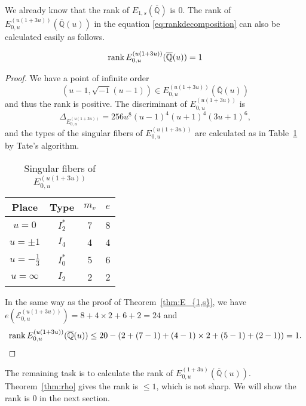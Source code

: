 \documentclass[main]{subfiles}
\begin{document}
We already know that the rank of $E_{1,s}(\overline{\mathbb{Q}})$ is $0$.
The rank of $E_{0,u}^{(u(1 + 3u))}(\overline{\mathbb{Q}}(u))$ in the equation \eqref{eq:rankdecomposition} can also be calculated easily as follows.

\begin{thm}
    \begin{equation*}
        \operatorname{rank} E_{0,u}^{(u(1 + 3u))}(\overline{\mathbb{Q}}(u)) = 1
    \end{equation*}
\end{thm}
\begin{proof}
    We have a point of infinite order
    \begin{equation*}
        (u - 1, \sqrt{-1}(u - 1)) \in E_{0,u}^{(u(1 + 3u))}(\overline{\mathbb{Q}}(u))
    \end{equation*}
    and thus the rank is positive.
    The discriminant of $E_{0,u}^{(u(1 + 3u))}$ is
    \begin{equation*}
        \Delta_{E_{0,u}^{(u(1 + 3u))}} = 256u^{8}(u - 1)^{4}(u + 1)^{4}(3u + 1)^{6},
    \end{equation*}
    and the types of the singular fibers of $E_{0,u}^{(u(1 + 3u))}$ are calculated as in Table~\ref{tab:E_{0,u}^{(u(1 + 3u))}} by Tate's algorithm.
    \begin{table}[H]
        \centering
        \caption{Singular fibers of $E_{0,u}^{(u(1 + 3u))}$}
        \begin{tabular}{|c|c|c|c|}
            \hline
            Place            & Type    & $m_v$ & $e$ \\
            \hline
            $u=0$            & $I_2^*$ & 7     & 8   \\
            $u=\pm 1$        & $I_4$   & 4     & 4   \\
            $u=-\frac{1}{3}$ & $I_0^*$ & 5     & 6   \\
            $u=\infty$       & $I_2$   & 2     & 2   \\
            \hline
        \end{tabular}
        \label{tab:E_{0,u}^{(u(1 + 3u))}}
    \end{table}
    In the same way as the proof of Theorem~\ref{thm:E_{1,s}}, we have $e(\mathcal{E}_{0,u}^{(u(1 + 3u))}) = 8 + 4 \times 2 + 6 + 2 = 24$ and
    \begin{equation*}
        \operatorname{rank} E_{0,u}^{(u(1 + 3u))}(\overline{\mathbb{Q}}(u)) \leq 20 - (2 + (7 - 1) + (4 - 1) \times 2 + (5 - 1) + (2 - 1)) = 1.
    \end{equation*}
\end{proof}

The remaining task is to calculate the rank of $E_{0,u}^{(1 + 3u)}(\overline{\mathbb{Q}}(u))$.
Theorem~\ref{thm:rho} gives the rank is $\leq 1$, which is not sharp.
We will show the rank is $0$ in the next section.
\end{document}
